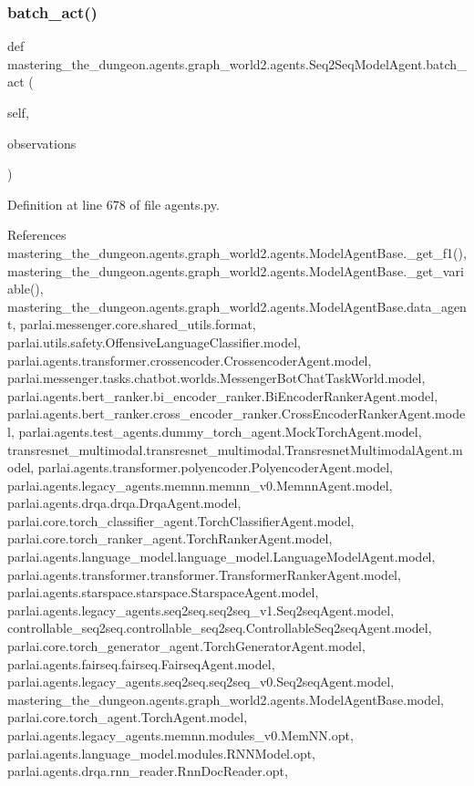 \subsubsection{\texorpdfstring{batch\+\_\+act()}{batch\_act()}}
{\footnotesize\ttfamily def mastering\+\_\+the\+\_\+dungeon.\+agents.\+graph\+\_\+world2.\+agents.\+Seq2\+Seq\+Model\+Agent.\+batch\+\_\+act (\begin{DoxyParamCaption}\item[{}]{self,  }\item[{}]{observations }\end{DoxyParamCaption})}



Definition at line 678 of file agents.\+py.



References mastering\+\_\+the\+\_\+dungeon.\+agents.\+graph\+\_\+world2.\+agents.\+Model\+Agent\+Base.\+\_\+get\+\_\+f1(), mastering\+\_\+the\+\_\+dungeon.\+agents.\+graph\+\_\+world2.\+agents.\+Model\+Agent\+Base.\+\_\+get\+\_\+variable(), mastering\+\_\+the\+\_\+dungeon.\+agents.\+graph\+\_\+world2.\+agents.\+Model\+Agent\+Base.\+data\+\_\+agent, parlai.\+messenger.\+core.\+shared\+\_\+utils.\+format, parlai.\+utils.\+safety.\+Offensive\+Language\+Classifier.\+model, parlai.\+agents.\+transformer.\+crossencoder.\+Crossencoder\+Agent.\+model, parlai.\+messenger.\+tasks.\+chatbot.\+worlds.\+Messenger\+Bot\+Chat\+Task\+World.\+model, parlai.\+agents.\+bert\+\_\+ranker.\+bi\+\_\+encoder\+\_\+ranker.\+Bi\+Encoder\+Ranker\+Agent.\+model, parlai.\+agents.\+bert\+\_\+ranker.\+cross\+\_\+encoder\+\_\+ranker.\+Cross\+Encoder\+Ranker\+Agent.\+model, parlai.\+agents.\+test\+\_\+agents.\+dummy\+\_\+torch\+\_\+agent.\+Mock\+Torch\+Agent.\+model, transresnet\+\_\+multimodal.\+transresnet\+\_\+multimodal.\+Transresnet\+Multimodal\+Agent.\+model, parlai.\+agents.\+transformer.\+polyencoder.\+Polyencoder\+Agent.\+model, parlai.\+agents.\+legacy\+\_\+agents.\+memnn.\+memnn\+\_\+v0.\+Memnn\+Agent.\+model, parlai.\+agents.\+drqa.\+drqa.\+Drqa\+Agent.\+model, parlai.\+core.\+torch\+\_\+classifier\+\_\+agent.\+Torch\+Classifier\+Agent.\+model, parlai.\+core.\+torch\+\_\+ranker\+\_\+agent.\+Torch\+Ranker\+Agent.\+model, parlai.\+agents.\+language\+\_\+model.\+language\+\_\+model.\+Language\+Model\+Agent.\+model, parlai.\+agents.\+transformer.\+transformer.\+Transformer\+Ranker\+Agent.\+model, parlai.\+agents.\+starspace.\+starspace.\+Starspace\+Agent.\+model, parlai.\+agents.\+legacy\+\_\+agents.\+seq2seq.\+seq2seq\+\_\+v1.\+Seq2seq\+Agent.\+model, controllable\+\_\+seq2seq.\+controllable\+\_\+seq2seq.\+Controllable\+Seq2seq\+Agent.\+model, parlai.\+core.\+torch\+\_\+generator\+\_\+agent.\+Torch\+Generator\+Agent.\+model, parlai.\+agents.\+fairseq.\+fairseq.\+Fairseq\+Agent.\+model, parlai.\+agents.\+legacy\+\_\+agents.\+seq2seq.\+seq2seq\+\_\+v0.\+Seq2seq\+Agent.\+model, mastering\+\_\+the\+\_\+dungeon.\+agents.\+graph\+\_\+world2.\+agents.\+Model\+Agent\+Base.\+model, parlai.\+core.\+torch\+\_\+agent.\+Torch\+Agent.\+model, parlai.\+agents.\+legacy\+\_\+agents.\+memnn.\+modules\+\_\+v0.\+Mem\+N\+N.\+opt, parlai.\+agents.\+language\+\_\+model.\+modules.\+R\+N\+N\+Model.\+opt, parlai.\+agents.\+drqa.\+rnn\+\_\+reader.\+Rnn\+Doc\+Reader.\+opt, 
